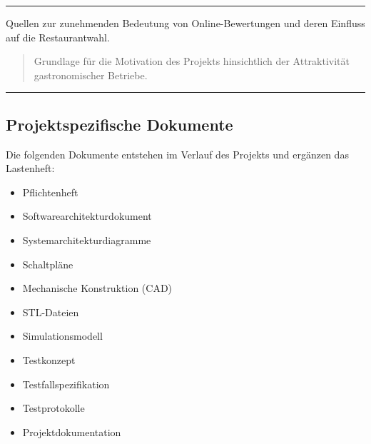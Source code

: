 \documentclass[
  a4paper,
  12pt,
  DIV=12,        %
  parskip=half,  %
  headings=small %
]{scrartcl}
\theoremstyle{definition}
\providecommand{\tightlist}{%
  \setlength{\itemsep}{0pt}\setlength{\parskip}{0pt}}
\theoremstyle{definition}
\begin{document}
\begin{center}\rule{0.5\linewidth}{0.5pt}\end{center}

Quellen zur zunehmenden Bedeutung von Online-Bewertungen und deren
Einfluss auf die Restaurantwahl.

\begin{quote}
Grundlage für die Motivation des Projekts hinsichtlich der Attraktivität
gastronomischer Betriebe.
\end{quote}

\begin{center}\rule{0.5\linewidth}{0.5pt}\end{center}

\subsection{Projektspezifische
Dokumente}\label{projektspezifische-dokumente}

Die folgenden Dokumente entstehen im Verlauf des Projekts und ergänzen
das Lastenheft:

\begin{itemize}
\tightlist
\item
  Pflichtenheft
\item
  Softwarearchitekturdokument
\item
  Systemarchitekturdiagramme
\item
  Schaltpläne
\item
  Mechanische Konstruktion (CAD)
\item
  STL-Dateien
\item
  Simulationsmodell
\item
  Testkonzept
\item
  Testfallspezifikation
\item
  Testprotokolle
\item
  Projektdokumentation
\end{itemize}
\end{document}
